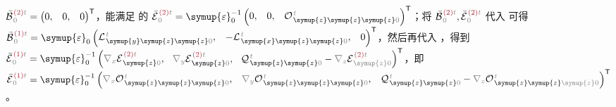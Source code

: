 $\bar{\mathcal{B}}^{\;\!\textcolor{Maroon}{(2)}\mathcolor{gray}{t}}_{\;\!  \mathcolor{gray}{0}} = \begin{pmatrix} 0, & 0, & 0 \end{pmatrix}^\mathsf{T}$，能满足  的 $\bar{\mathcal{E}}^{\;\!\textcolor{Maroon}{(2)}\mathcolor{gray}{t}}_{\;\!  \mathcolor{gray}{0}} = {\symup{\varepsilon}}_0^{-1} \begin{pmatrix} 0, & 0, & {\mathcal{O}}^{\;\!\mathcolor{gray}{t}}_{\;\! \symup{z} \symup{z} \symup{z} \mathcolor{gray}{0}} \end{pmatrix}^\mathsf{T}$；将 $\bar{\mathcal{B}}^{\;\!\textcolor{Maroon}{(2)}\mathcolor{gray}{t}}_{\;\!  \mathcolor{gray}{0}},\bar{\mathcal{E}}^{\;\!\textcolor{Maroon}{(2)}\mathcolor{gray}{t}}_{\;\! \mathcolor{gray}{0}}$ 代入  可得 $\bar{\mathcal{B}}^{\;\!\textcolor{Maroon}{(1)}\mathcolor{gray}{t}}_{\;\!  \mathcolor{gray}{0}} = {\symup{\varepsilon}}_0 \begin{pmatrix} {\mathcal{L}}^{\;\!\mathcolor{gray}{t}}_{\;\! \symup{y} \symup{z} \symup{z} \mathcolor{gray}{0}}, & - {\mathcal{L}}^{\;\!\mathcolor{gray}{t}}_{\;\! \symup{x} \symup{z} \symup{z} \mathcolor{gray}{0}}, & 0 \end{pmatrix}^\mathsf{T}$，然后再代入 ，得到 $\bar{\mathcal{E}}^{\;\!\textcolor{Maroon}{(1)}\mathcolor{gray}{t}}_{\;\!  \mathcolor{gray}{0}} = {\symup{\varepsilon}}_0^{-1} \left( \mathcolor{gray}{\nabla_x} \mathcal{E}^{\;\!\textcolor{Maroon}{(2)}\mathcolor{gray}{t}}_{\;\! \symup{z} \mathcolor{gray}{0}}, \right.$ $\left. \mathcolor{gray}{\nabla_y} \mathcal{E}^{\;\!\textcolor{Maroon}{(2)}\mathcolor{gray}{t}}_{\;\! \symup{z} \mathcolor{gray}{0}},~~ {\mathcal{Q}}^{\;\!\mathcolor{gray}{t}}_{\;\! \symup{z} \symup{z} \mathcolor{gray}{0}} - \mathcolor{gray}{\nabla_z} \mathcal{E}^{\;\!\textcolor{Maroon}{(2)}\mathcolor{gray}{t}}_{\;\! \mathcolor{gray}{\symup{z}} \mathcolor{gray}{0}} \right)^\mathsf{T}$，即 $\bar{\mathcal{E}}^{\;\!\textcolor{Maroon}{(1)}\mathcolor{gray}{t}}_{\;\!  \mathcolor{gray}{0}} = {\symup{\varepsilon}}_0^{-1} \begin{pmatrix} \mathcolor{gray}{\nabla_x} {\mathcal{O}}^{\;\!\mathcolor{gray}{t}}_{\;\! \symup{z} \symup{z} \symup{z} \mathcolor{gray}{0}}, & \mathcolor{gray}{\nabla_y} {\mathcal{O}}^{\;\!\mathcolor{gray}{t}}_{\;\! \symup{z} \symup{z} \symup{z} \mathcolor{gray}{0}}, & {\mathcal{Q}}^{\;\!\mathcolor{gray}{t}}_{\;\! \symup{z} \symup{z} \mathcolor{gray}{0}} - \mathcolor{gray}{\nabla_z} {\mathcal{O}}^{\;\!\mathcolor{gray}{t}}_{\;\! \symup{z} \symup{z} \mathcolor{gray}{\symup{z}} \mathcolor{gray}{0}} \end{pmatrix}^\mathsf{T}$。

